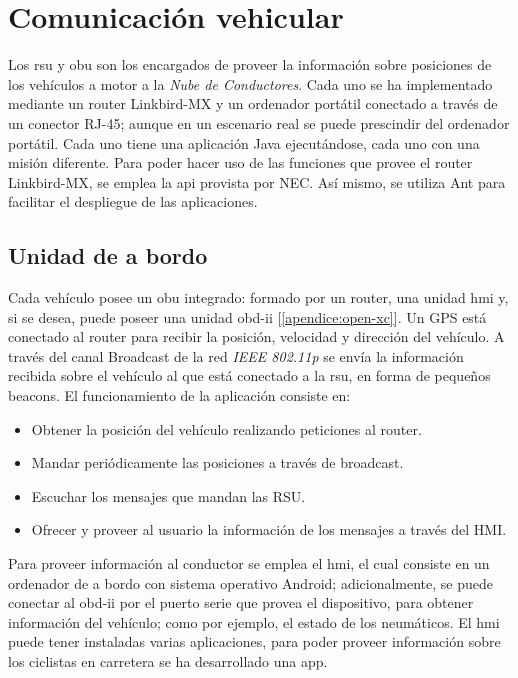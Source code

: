 \section{Comunicación vehicular}\label{section:comunicacion_vehicular}
Los \gls{rsu} y \gls{obu} son los encargados de proveer la información sobre posiciones
de los vehículos a motor a la \emph{Nube de Conductores}. Cada uno se ha implementado
mediante un router Linkbird-MX y un ordenador portátil conectado a través de un conector
RJ-45; aunque en un escenario real se puede prescindir del ordenador portátil. Cada
uno tiene una aplicación Java ejecutándose, cada uno con una misión diferente. Para
poder hacer uso de las funciones que provee el router Linkbird-MX, se emplea la \gls{api}
provista por NEC. Así mismo, se utiliza Ant para facilitar el despliegue de las
aplicaciones.

\subsection{Unidad de a bordo}
Cada vehículo posee un \gls{obu} integrado: formado por un router, una unidad \gls{hmi}
y, si se desea, puede poseer una unidad \Gls{obd-ii} [\ref{apendice:open-xc}]. Un GPS
está conectado al router para recibir la posición, velocidad y dirección del vehículo.
A través del canal Broadcast de la red \emph{IEEE 802.11p} se envía la información
recibida sobre el vehículo al que está conectado a la \gls{rsu}, en forma de pequeños
beacons. El funcionamiento de la aplicación consiste en:
\begin{itemize}
	\item Obtener la posición del vehículo realizando peticiones al router.

	\item Mandar periódicamente las posiciones a través de broadcast.

	\item Escuchar los mensajes que mandan las RSU.

	\item Ofrecer y proveer al usuario la información de los mensajes a través del HMI.
\end{itemize}

Para proveer información al conductor se emplea el \gls{hmi}, el cual consiste en un
ordenador de a bordo con sistema operativo Android; adicionalmente, se puede conectar
al \Gls{obd-ii} por el puerto serie que provea el dispositivo, para obtener información
del vehículo; como por ejemplo, el estado de los neumáticos. El \gls{hmi} puede tener
instaladas varias aplicaciones, para poder proveer información sobre los ciclistas en
carretera se ha desarrollado una app.

